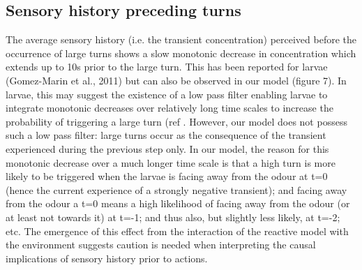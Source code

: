 \documentclass[10pt,a4paper]{article}
\begin{document}
\subsection{Sensory history preceding turns}
The average sensory history (i.e. the transient concentration) perceived before the occurrence of large turns shows a slow monotonic decrease in concentration which extends up to 10s prior to the large turn. This has been reported for larvae (Gomez-Marin et al., 2011) but can also be observed in our model (figure 7). In larvae, this may suggest the existence of a low pass filter enabling larvae to integrate monotonic decreases over relatively long time scales to increase the probability of triggering a large turn (ref . However, our model does not possess such a low pass filter: large turns occur as the consequence of the transient experienced during the previous step only. In our model, the reason for this monotonic decrease over a much longer time scale is that a high turn is more likely to be triggered when the larvae is facing away from the odour at t=0 (hence the current experience of a strongly negative transient); and facing away from the odour a t=0 means a high likelihood of facing away from the odour (or at least not towards it) at t=-1; and thus also, but slightly less likely, at t=-2; etc. The emergence of this effect from the interaction of the reactive model with the environment suggests caution is needed when interpreting the causal implications of sensory history prior to actions.
\end{document}
